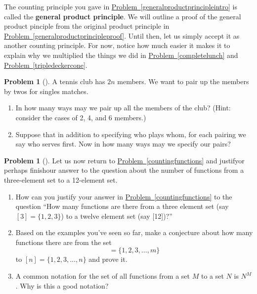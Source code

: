 \documentclass[10pt,]{book}
\newcommand{\terminology}[1]{\textbf{#1}}
\theoremstyle{plain}
\theoremstyle{definition}
\newtheorem{activity}[project]{Problem}
\theoremstyle{definition}
\numberwithin{equation}{chapter}
\newcommand{\importantarrow}{\Rightarrow}
\begin{document}
The counting principle you gave in \hyperref[generalproductprincipleintro]{Problem~\ref{generalproductprincipleintro}} is called the \terminology{general product principle}. We will outline a proof of the general product pinciple from the original product principle in \hyperref[generalproductprincipleproof]{Problem~\ref{generalproductprincipleproof}}. Until then, let us simply accept it as another counting principle. For now, notice how much easier it makes it to explain why we multiplied the things we did in \hyperref[completelunch]{Problem~\ref{completelunch}} and \hyperref[tripledeckercone]{Problem~\ref{tripledeckercone}}.%
\begin{activity}[]\marginsymbol[-1em]{\pdftooltip{$\importantarrow$}{especially interesting}} \label{tennispairings1}
A tennis club has \(2n\) members. We want to pair up the members by twos for singles matches.%
\begin{enumerate}[font=\bfseries,label=(\alph*),ref=\alph*]
\item\label{tennispairings1a} \marginsymbol[-2.5em]{} In how many ways may we pair up all the members of the club? (Hint: consider the cases of 2, 4, and 6 members.)%
\item\label{task-14} \marginsymbol[-2.5em]{} Suppose that in addition to specifying who plays whom, for each pairing we say who serves first.  Now in how many ways may we specify our pairs?%
\end{enumerate}
\end{activity}
\begin{activity}[] \label{countingfunctions2}
Let us now return to \hyperref[countingfunctions]{Problem~\ref{countingfunctions}} and justify\textemdash{}or perhaps finish\textemdash{}our answer to the question about the number of functions from a three-element set to a 12-element set.%
\begin{enumerate}[font=\bfseries,label=(\alph*),ref=\alph*]
\item\label{task-15} \marginsymbol[-2.5em]{} How can you justify your answer in \hyperref[countingfunctions]{Problem~\ref{countingfunctions}} to the question ``How many functions are there from a three element set (say \([3]=\{1,2,3\}\)) to a twelve element set (say [12])?''%
\item\label{numberoffunctionsconjecture} \marginsymbol[-2.5em]{} Based on the examples you've seen so far, make a conjecture about how many functions there are from the set%
\begin{equation*}
[m] = \{1,2,3,\dots,m\}
\end{equation*}
to \([n]=\{1,2,3,\dots,n\}\) and prove it.%
\item\label{task-17} \marginsymbol[-2.5em]{} A common notation for the set of all functions from a set \(M\) to a set \(N\) is \(N^M\).  Why is this a good notation?%
\end{enumerate}
\end{activity}
\end{document}
